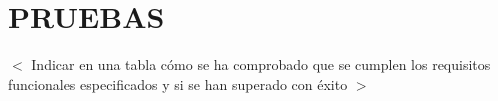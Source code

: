 \chapter{PRUEBAS}

$<$ Indicar en una tabla cómo se ha comprobado que se cumplen los requisitos funcionales especificados y si se han superado con éxito $>$
